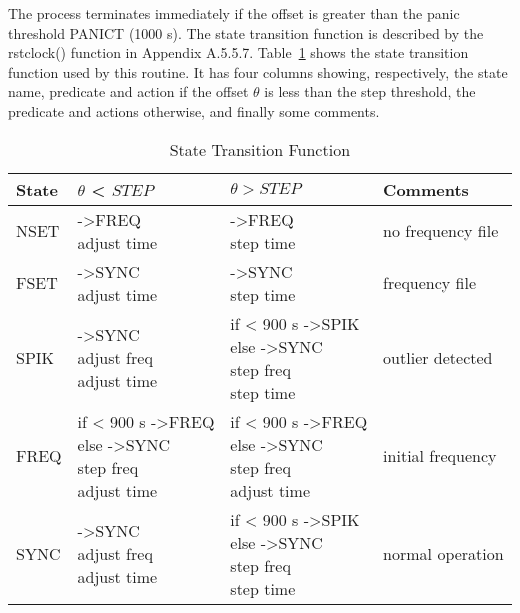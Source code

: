 The process terminates immediately if the offset is greater than the
panic threshold PANICT (1000 s). The state transition function is
described by the rstclock() function in Appendix A.5.5.7. Table~\ref{state_transition_function}
shows the state transition function used by this routine. It has
four columns showing, respectively, the state name, predicate and
action if the offset $ \theta $ is less than the step threshold, the
predicate and actions otherwise, and finally some comments.

\begin{table}[htb]
\center
\begin{tabular}{| l | l | l | l |}
\hline
State & $ \theta $ < $ STEP $        & $ \theta > STEP $      & Comments \\
\hline
\hline
NSET & \makecell[l]{->FREQ \\ adjust time} & \makecell[l]{->FREQ \\ step time} & no frequency file \\
FSET & \makecell[l]{->SYNC \\ adjust time} & \makecell[l]{->SYNC \\ step time} & frequency file \\
SPIK & \makecell[l]{->SYNC \\ adjust freq \\ adjust time} & \makecell[l]{if < 900 s ->SPIK \\ else ->SYNC \\ step freq \\ step time} & outlier detected \\
FREQ & \makecell[l]{if < 900 s ->FREQ \\ else ->SYNC \\ step freq \\ adjust time} & \makecell[l]{if < 900 s ->FREQ \\ else ->SYNC \\ step freq \\ adjust time} & initial frequency \\
SYNC & \makecell[l]{->SYNC \\ adjust freq \\ adjust time} & \makecell[l]{if < 900 s ->SPIK \\ else ->SYNC \\ step freq \\ step time} & normal operation \\
\hline
\end{tabular}
\caption{State Transition Function}
\label{state_transition_function}
\end{table}


